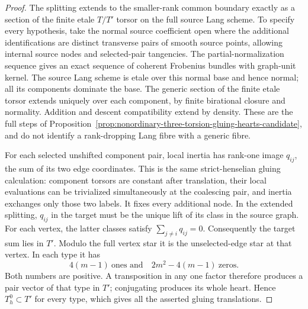 \begin{proof}
The splitting extends to the smaller-rank common boundary exactly
as a section of the finite etale $T/T'$ torsor on the full source
Lang scheme.  To specify every hypothesis, take the normal source
coefficient open where the additional identifications are distinct
transverse pairs of smooth source points, allowing internal source
nodes and selected-pair tangencies.  The partial-normalization
sequence gives an exact sequence of coherent Frobenius bundles
with graph-unit kernel.  The source Lang scheme is etale over this
normal base and hence normal; all its components dominate the base.
The generic section of the finite etale torsor extends uniquely
over each component, by finite birational closure and normality.
Addition and descent compatibility extend by density.  These are
the full steps of
Proposition~\ref{prop:nonordinary-three-torsion-gluing-hearts-candidate},
and do not identify a rank-dropping Lang fibre with a generic fibre.

For each selected unshifted component pair, local inertia has
rank-one image $q_{ij}$, the sum of its two edge coordinates.
This is the same strict-henselian gluing calculation: component
torsors are constant after translation, their local evaluations
can be trivialized simultaneously at the coalescing pair, and
inertia exchanges only those two labels.  It fixes every additional
node.  In the extended splitting, $q_{ij}$ in the target must be
the unique lift of its class in the source graph.  For each vertex,
the latter classes satisfy $\sum_{j\ne i}q_{ij}=0$.
Consequently the target sum lies in $T'$.  Modulo the full vertex
star it is the unselected-edge star at that vertex.  In each type
it has
\[
                  4(m-1)\ \text{ones and}\quad
                  2m^2-4(m-1)\ \text{zeros}.            \tag{RD-A4-3P.3}
\]
Both numbers are positive.  A transposition in any one factor
therefore produces a pair vector of that type in $T'$; conjugating
produces its whole heart.  Hence $T_h^0\subset T'$ for every type,
which gives all the asserted gluing translations.
\end{proof}

